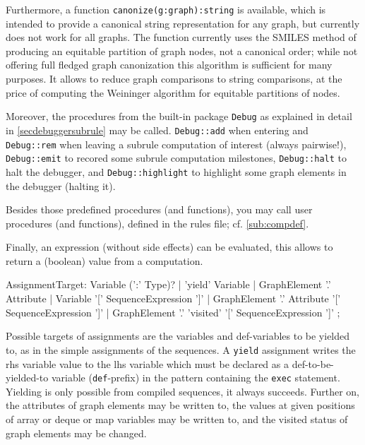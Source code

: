 Furthermore, a function \texttt{canonize(g:graph):string} is available,
which is intended to provide a canonical string representation for any graph, but currently does not work for all graphs.
The function currently uses the SMILES\cite{SMILES} method of producing an equitable partition of graph nodes, not a canonical order; while not offering full fledged graph canonization this algorithm is sufficient for many purposes. 
It allows to reduce graph comparisons to string comparisons, at the price of computing the Weininger algorithm for equitable partitions of nodes.

Moreover, the procedures from the built-in package \texttt{Debug} as explained in detail in \ref{secdebuggersubrule} may be called.
\texttt{Debug::add} when entering and \texttt{Debug::rem} when leaving a subrule computation of interest (always pairwise!),
\texttt{Debug::emit} to recored some subrule computation milestones, \texttt{Debug::halt} to halt the debugger, and \texttt{Debug::highlight} to highlight some graph elements in the debugger (halting it).

Besides those predefined procedures (and functions), you may call user procedures (and functions), defined in the rules file; cf. \ref{sub:compdef}.

Finally, an expression (without side effects) can be evaluated, this allows to return a (boolean) value from a computation.

\begin{rail}
  AssignmentTarget: 
    Variable (':' Type)? |
    'yield' Variable |
    GraphElement '.' Attribute |
    Variable '[' SequenceExpression ']' |
    GraphElement '.' Attribute '[' SequenceExpression ']' |
    GraphElement '.' 'visited' '[' SequenceExpression ']'
;
\end{rail}

Possible targets of assignments are the variables and def-variables to be yielded to, as in the simple assignments of the sequences. 
A \texttt{yield} assignment writes the rhs variable value to the lhs variable which must be declared as a  def-to-be-yielded-to variable (\texttt{def}-prefix) in the pattern containing the \texttt{exec} statement.
Yielding is only possible from compiled sequences, it always succeeds.
Further on, the attributes of graph elements may be written to, the values at given positions of array or deque or map variables may be written to, and the visited status of graph elements may be changed.

